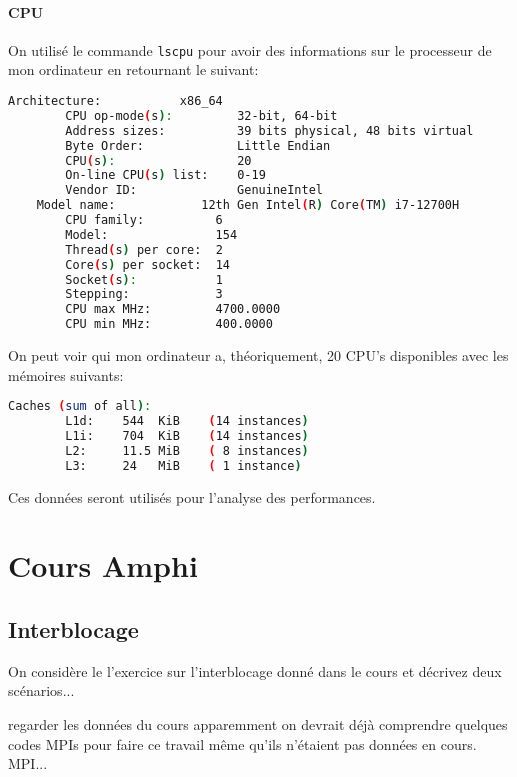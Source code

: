 \documentclass{article}
\begin{document}
\paragraph{CPU}On utilisé le commande \texttt{lscpu} pour avoir des informations sur le processeur de mon ordinateur en retournant le suivant:
\begin{scriptsize}
    \mycode
    \begin{lstlisting}[language=bash]
    Architecture:           x86_64
        CPU op-mode(s):         32-bit, 64-bit
        Address sizes:          39 bits physical, 48 bits virtual
        Byte Order:             Little Endian
        CPU(s):                 20
        On-line CPU(s) list:    0-19
        Vendor ID:              GenuineIntel
    Model name:            12th Gen Intel(R) Core(TM) i7-12700H
        CPU family:          6
        Model:               154
        Thread(s) per core:  2
        Core(s) per socket:  14
        Socket(s):           1
        Stepping:            3
        CPU max MHz:         4700.0000
        CPU min MHz:         400.0000
    \end{lstlisting}
\end{scriptsize}
On peut voir qui mon ordinateur a, théoriquement, 20 CPU's disponibles avec les mémoires suivants:
\begin{scriptsize}
    \mycode
    \begin{lstlisting}[language=bash]
    Caches (sum of all):     
        L1d:    544  KiB    (14 instances)
        L1i:    704  KiB    (14 instances)
        L2:     11.5 MiB    ( 8 instances)
        L3:     24   MiB    ( 1 instance)
    \end{lstlisting}
\end{scriptsize}
Ces données seront utilisés pour l'analyse des performances.


\section{Cours Amphi}
\begin{resolution}

\end{resolution}

\subsection{Interblocage}
\begin{resolution}
    On considère le l'exercice sur l'interblocage donné dans le cours et décrivez deux scénarios...

    regarder les données du cours
    apparemment on devrait déjà comprendre quelques codes MPIs pour faire ce travail même qu'ils n'étaient pas données en cours.
    MPI...
    
\end{resolution}
\end{document}
